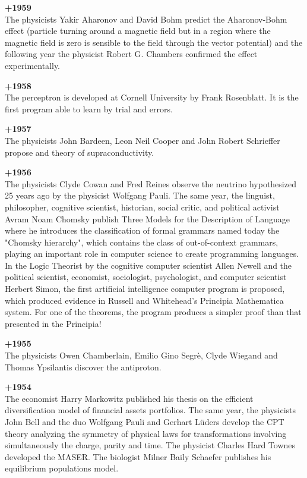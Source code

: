 \textbf{+1959}\\
The physicists Yakir Aharonov and David Bohm predict the Aharonov-Bohm effect (particle turning around a magnetic field but in a region where the magnetic field is zero is sensible to the field through the vector potential) and the following year the physicist Robert G. Chambers confirmed the effect experimentally. 

\textbf{+1958}\\
The perceptron is developed at Cornell University by Frank Rosenblatt. It is the first program able to learn by trial and errors.

\textbf{+1957}\\
The physicists John Bardeen, Leon Neil Cooper and John Robert Schrieffer propose and theory of supraconductivity.

\textbf{+1956}\\
The physicists Clyde Cowan and Fred Reines observe the neutrino hypothesized 25 years ago by the physicist Wolfgang Pauli. The same year, the  linguist, philosopher, cognitive scientist, historian, social critic, and political activist Avram Noam Chomsky publish Three Models for the Description of Language where he introduces the classification of formal grammars named today the "Chomsky hierarchy", which contains the class of out-of-context grammars, playing an important role in computer science to create programming languages. In the Logic Theorist by the cognitive computer scientist Allen Newell and the political scientist, economist, sociologist, psychologist, and computer scientist Herbert Simon, the first artificial intelligence computer program is proposed, which produced evidence in Russell and Whitehead's Principia Mathematica system. For one of the theorems, the program produces a simpler proof than that presented in the Principia!

\textbf{+1955}\\
The physicists Owen Chamberlain, Emilio Gino Segrè, Clyde Wiegand and Thomas Ypsilantis discover the antiproton.

\textbf{+1954}\\
The economist Harry Markowitz published his thesis on the efficient diversification model of financial assets portfolios. The same year, the physicists John Bell and the duo Wolfgang Pauli and Gerhart Lüders develop the CPT theory analyzing the symmetry of physical laws for transformations involving simultaneously the charge, parity and time. The physicist Charles Hard Townes developed the MASER. The biologist Milner Baily Schaefer publishes his equilibrium populations model.

